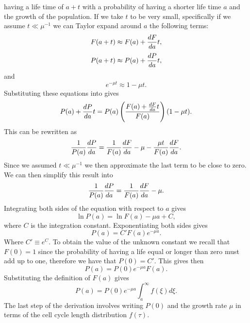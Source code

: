 having a life time of $a + t$ with a probability of having a shorter life time
$a$ and the growth of the population. If we take $t$ to be very small,
specifically if we assume $t \ll \mu^{-1}$ we can Taylor expand around $a$ the
following terms:
\begin{equation}
  F(a + t) \approx F(a) + {dF \over da} t,
\end{equation}
\begin{equation}
  P(a + t) \approx P(a) + {dP \over da} t,
\end{equation}
and
\begin{equation}
  e^{-\mu t} \approx 1 - \mu t.
\end{equation}
Substituting these equations into  gives
\begin{equation}
  P(a) + {dP \over da} t = P(a) \left( {F(a) + {dF \over da}t \over
  F(a)} \right) (1 - \mu t).
\end{equation}
This can be rewritten as
\begin{equation}
  {1 \over P(a)} {dP \over da} =
  {1 \over F(a)} {dF \over da} - \mu - {\mu t \over F(a)} {dF \over da}.
\end{equation}
Since we assumed $t \ll \mu^{-1}$ we then approximate the last term to be close
to zero. We can then simplify this result into
\begin{equation}
  {1 \over P(a)} {dP \over da} = {1 \over F(a)} {dF \over da} - \mu.
\end{equation}
Integrating both sides of the equation with respect to $a$ gives
\begin{equation}
  \ln P(a) = \ln F(a) - \mu a + C,
\end{equation}
where $C$ is the integration constant. Exponentiating both sides gives
\begin{equation}
  P(a) = C' F(a)e^{-\mu a}.
\end{equation}
Where $C' \equiv e^C$. To obtain the value of the unknown constant we recall
that $F(0) = 1$ since the probability of having a life equal or longer than zero
must add up to one, therefore we have that $P(0) = C'$. This gives then
\begin{equation}
  P(a) = P(0) e^{-\mu a} F(a).
  \label{seq_Pa_result}
\end{equation}
Substituting the definition of $F(a)$ gives
\begin{equation}
  P(a) = P(0) e^{-\mu a} \int_a^\infty f(\xi) d\xi.
  \label{seq_Pa_result_int}
\end{equation}
The last step of the derivation involves writing $P(0)$ and the growth rate
$\mu$ in terms of the cell cycle length distribution $f(\tau)$.

